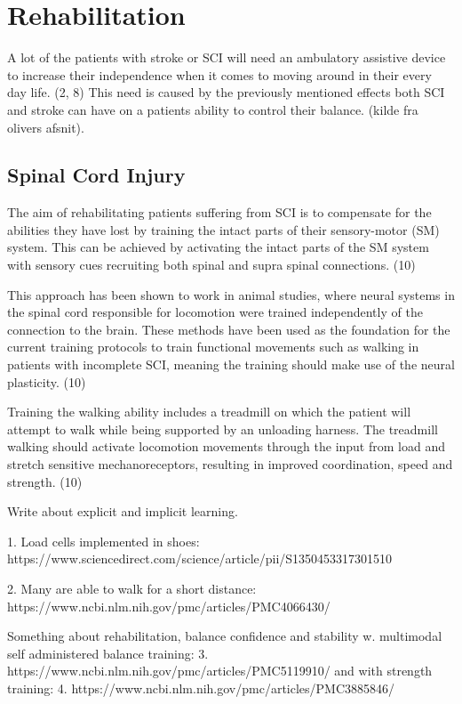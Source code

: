 \section{Rehabilitation}

A lot of the patients with stroke or SCI will need an ambulatory assistive device to increase their independence when it comes to moving around in their every day life. (2, 8) This need is caused by the previously mentioned effects both SCI and stroke can have on a patients ability to control their balance. (kilde fra olivers afsnit). 

\subsection{Spinal Cord Injury}

The aim of rehabilitating patients suffering from SCI is to compensate for the abilities they have lost by training the intact parts of their sensory-motor (SM) system. This can be achieved by activating the intact parts of the SM system with sensory cues recruiting both spinal and supra spinal connections. (10)

This approach has been shown to work in animal studies, where neural systems in the spinal cord responsible for locomotion were trained independently of the connection to the brain. These methods have been used as the foundation for the current training protocols to train functional movements such as walking in patients with incomplete SCI, meaning the training should make use of the neural plasticity. (10)

Training the walking ability includes a treadmill on which the patient will attempt to walk while being supported by an unloading harness. The treadmill walking should activate locomotion movements through the input from load and stretch sensitive mechanoreceptors, resulting in improved coordination, speed and strength. (10)

Write about explicit and implicit learning.


1. Load cells implemented in shoes: https://www.sciencedirect.com/science/article/pii/S1350453317301510

2. Many are able to walk for a short distance: https://www.ncbi.nlm.nih.gov/pmc/articles/PMC4066430/ 

Something about rehabilitation, balance confidence and stability w. multimodal self administered balance training: 3. https://www.ncbi.nlm.nih.gov/pmc/articles/PMC5119910/ and with strength training: 4. https://www.ncbi.nlm.nih.gov/pmc/articles/PMC3885846/ 

